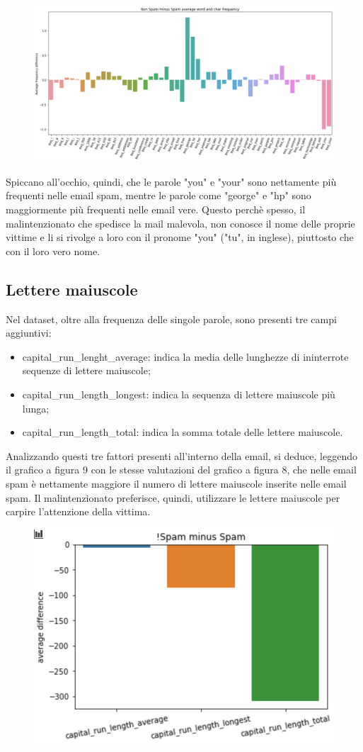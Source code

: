 \documentclass[12pt,a4paper]{article}
\begin{document}
\begin{figure}[h]
    \includegraphics[width=1\columnwidth]{df_difference_barplot.png}
    \caption{}
\end{figure}

Spiccano all'occhio, quindi, che le parole "you" e "your" sono nettamente più frequenti nelle email spam, mentre le parole come "george" e "hp" sono maggiormente più frequenti nelle email vere. Questo perchè spesso, il malintenzionato che spedisce la mail malevola, non conosce il nome delle proprie vittime e li si rivolge a loro con il pronome "you" ("tu", in inglese), piuttosto che con il loro vero nome.
\subsection{Lettere maiuscole}
Nel dataset, oltre alla frequenza delle singole parole, sono presenti tre campi aggiuntivi:
\begin{itemize}
    \item capital\_run\_lenght\_average: indica la media delle lunghezze di ininterrote sequenze di lettere maiuscole;
    \item capital\_run\_length\_longest: indica la sequenza di lettere maiuscole più lunga;
    \item capital\_run\_length\_total: indica la somma totale delle lettere maiuscole.
\end{itemize}

Analizzando questi tre fattori presenti all'interno della email, si deduce, leggendo il grafico a figura 9 con le stesse valutazioni del grafico a figura 8, che nelle email spam è nettamente maggiore il numero di lettere maiuscole inserite nelle email spam.
Il malintenzionato preferisce, quindi, utilizzare le lettere maiuscole per carpire l'attenzione della vittima.

\begin{figure}[H]
    \centering
    \includegraphics[width=.4\columnwidth]{capital_plot.png}
    \caption{}
\end{figure}
\clearpage
\end{document}
